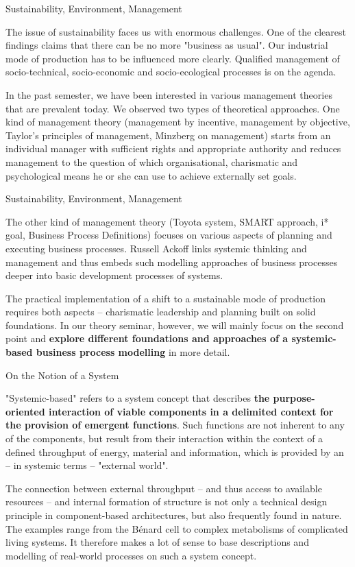 \documentclass{beamer}
\begin{document}
\begin{frame}{Sustainability, Environment, Management}

The issue of sustainability faces us with enormous challenges. One of the
clearest findings claims that there can be no more "business as usual". Our
industrial mode of production has to be influenced more clearly. Qualified
management of socio-technical, socio-economic and socio-ecological processes
is on the agenda.

In the past semester, we have been interested in various management theories
that are prevalent today.  We observed two types of theoretical approaches.
One kind of management theory (management by incentive, management by
objective, Taylor's principles of management, Minzberg on management) starts
from an individual manager with sufficient rights and appropriate authority
and reduces management to the question of which organisational, charismatic
and psychological means he or she can use to achieve externally set goals.

\end{frame}

\begin{frame}{Sustainability, Environment, Management}

The other kind of management theory (Toyota system, SMART approach, i* goal,
Business Process Definitions) focuses on various aspects of planning and
executing business processes. Russell Ackoff links systemic thinking and
management and thus embeds such modelling approaches of business processes
deeper into basic development processes of systems.

The practical implementation of a shift to a sustainable mode of production
requires both aspects -- charismatic leadership and planning built on solid
foundations. In our theory seminar, however, we will mainly focus on the
second point and \textbf{explore different foundations and approaches of a
  systemic-based business process modelling} in more detail.

\end{frame}

\begin{frame}{On the Notion of a System}

"Systemic-based" refers to a system concept that describes \textbf{the
  purpose-oriented interaction of viable components in a delimited context for
  the provision of emergent functions}. Such functions are not inherent to any
of the components, but result from their interaction within the context of a
defined throughput of energy, material and information, which is provided by
an -- in systemic terms -- "external world".

The connection between external throughput -- and thus access to available
resources -- and internal formation of structure is not only a technical
design principle in component-based architectures, but also frequently found
in nature. The examples range from the Bénard cell to complex metabolisms of
complicated living systems. It therefore makes a lot of sense to base
descriptions and modelling of real-world processes on such a system concept.

\end{frame}
\end{document}
